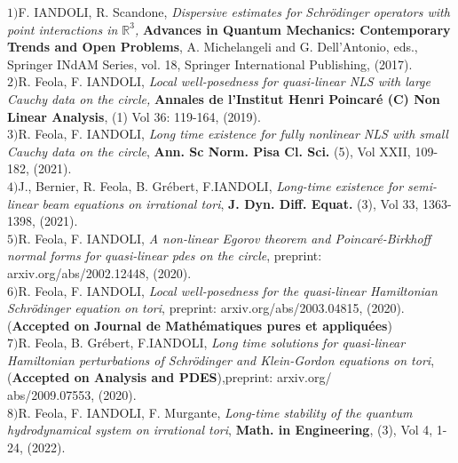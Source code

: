 \documentclass[margin,line,pifont,palatino,courier]{res}
\begin{document}
\begin{resume}
$1)${\rm{F. IANDOLI, R. Scandone}},  \textit{Dispersive estimates for Schr\"odinger operators with point interactions in $\mathbb{R}^3$,}  {\textbf {Advances in Quantum Mechanics: Contemporary Trends and Open Problems}}, A. Michelangeli and G. Dell'Antonio, eds., Springer INdAM Series, vol. 18, Springer International Publishing, (2017).\vspace{0.1cm}\\
$2)${\rm{R. Feola, F. IANDOLI}},  \textit{Local well-posedness for quasi-linear NLS with large Cauchy data on the circle,}  \textbf{Annales de l'Institut Henri Poincar\'e (C) Non Linear Analysis}, (1) Vol 36: 119-164, (2019).\vspace{0.1cm}\\
$3)${\rm{R. Feola, F. IANDOLI}}, \textit{Long time existence for fully nonlinear NLS with small Cauchy data on the circle},   \textbf{Ann. Sc Norm.  Pisa Cl. Sci.} (5), Vol XXII, 109-182, (2021).\vspace{0.1cm}\\
$4)${\rm{J., Bernier, R. Feola, B. Gr\'ebert, F.IANDOLI}}, \textit{Long-time existence for semi-linear beam equations on irrational tori},  \textbf{J. Dyn. Diff. Equat.} (3), Vol 33, 1363-1398, (2021). \vspace{0.1cm}\\
$5)${\rm{R. Feola, F. IANDOLI}}, \textit{A non-linear Egorov theorem and Poincar\'e-Birkhoff normal forms for quasi-linear pdes on the circle}, preprint: arxiv.org/abs/2002.12448, (2020).\vspace{0.1cm}\\
$6)${\rm{R. Feola, F. IANDOLI}}, \textit{Local well-posedness for the quasi-linear Hamiltonian Schr\"odinger equation on tori}, preprint: arxiv.org/abs/2003.04815, (2020). (\textbf{Accepted on Journal de Math\'ematiques pures et appliqu\'ees})\vspace{0.1cm}\\
$7)${\rm{R. Feola, B. Gr\'ebert, F.IANDOLI}}, \textit{Long time solutions for quasi-linear Hamiltonian perturbations of Schr\"odinger and Klein-Gordon equations on tori}, (\textbf{Accepted on Analysis and PDES}),preprint: arxiv.org/\\abs/2009.07553, (2020). \vspace{0.1cm}\\
$8)${\rm{R. Feola, F. IANDOLI, F. Murgante}}, \textit{Long-time stability of the quantum hydrodynamical system on irrational tori}, \textbf{Math. in Engineering}, (3), Vol 4, 1-24, (2022).\vspace{0.1cm}\\




\end{resume}
\end{document}
